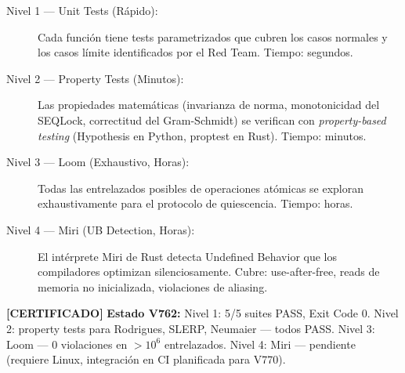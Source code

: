 \begin{description}
\item[Nivel 1 --- Unit Tests (Rápido):] Cada función tiene tests parametrizados
que cubren los casos normales y los casos límite identificados por el Red Team.
Tiempo: segundos.

\item[Nivel 2 --- Property Tests (Minutos):] Las propiedades matemáticas
(invarianza de norma, monotonicidad del SEQLock, correctitud del Gram-Schmidt)
se verifican con \textit{property-based testing} (Hypothesis en Python, proptest en Rust).
Tiempo: minutos.

\item[Nivel 3 --- Loom (Exhaustivo, Horas):] Todas las entrelazados posibles de
operaciones atómicas se exploran exhaustivamente para el protocolo de quiescencia.
Tiempo: horas.

\item[Nivel 4 --- Miri (UB Detection, Horas):] El intérprete Miri de Rust detecta
Undefined Behavior que los compiladores optimizan silenciosamente. Cubre:
use-after-free, reads de memoria no inicializada, violaciones de aliasing.
\end{description}

\textbf{[CERTIFICADO]} 
\textbf{Estado V762:}
Nivel 1: 5/5 suites PASS, Exit Code 0.
Nivel 2: property tests para Rodrigues, SLERP, Neumaier --- todos PASS.
Nivel 3: Loom --- 0 violaciones en $> 10^6$ entrelazados.
Nivel 4: Miri --- pendiente (requiere Linux, integración en CI planificada para V770).

